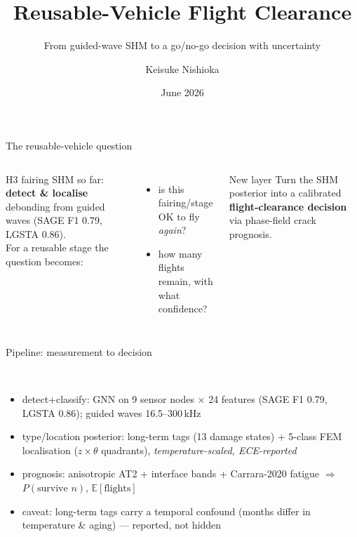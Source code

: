 \documentclass[aspectratio=169, 10pt]{beamer}
\title{Reusable-Vehicle Flight Clearance}
\subtitle{From guided-wave SHM to a go/no-go decision with uncertainty}
\author{Keisuke Nishioka}
\institute{Payload2026 \quad$\cdot$\quad LUH / Keio}
\date{June 2026}
\newcommand{\best}[1]{\textbf{\textcolor{luhblue}{#1}}}
\begin{document}
\maketitle

\begin{frame}{The reusable-vehicle question}
\begin{columns}[T]
H3 fairing SHM so far: \best{detect \& localise} debonding from guided waves
(SAGE F1 0.79, LGSTA 0.86).\\[2mm]
For a \alert{reusable} stage the question becomes:
\begin{itemize}
  \item is this fairing/stage OK to fly \emph{again}?
  \item how many flights remain, with what confidence?
\end{itemize}
\begin{block}{New layer}
Turn the SHM posterior into a calibrated
\textbf{flight-clearance decision} via phase-field crack prognosis.
\end{block}
\end{columns}
\end{frame}

\begin{frame}{Pipeline: measurement to decision}
\centering
{}\\[3mm]
\begin{itemize}\footnotesize
  \item detect+classify: GNN on 9 sensor nodes $\times$ 24 features
        (SAGE F1 0.79, LGSTA 0.86); guided waves 16.5--300\,kHz
  \item type/location posterior: long-term tags (13 damage states) +
        5-class FEM localisation ($z\times\theta$ quadrants),
        \emph{temperature-scaled, ECE-reported}
  \item prognosis: anisotropic AT2 + interface bands + Carrara-2020 fatigue
        $\Rightarrow$ $P(\text{survive }n)$, $\mathbb{E}[\text{flights}]$
  \item caveat: long-term tags carry a temporal confound
        (months differ in temperature \& aging) --- reported, not hidden
\end{itemize}
\end{frame}
\end{document}
